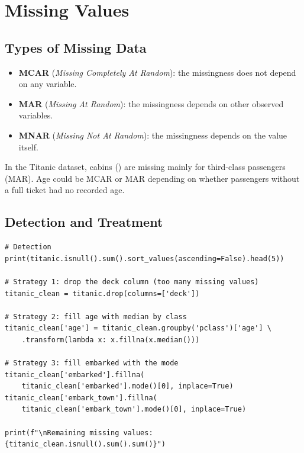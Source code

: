 \section{Missing Values}

\subsection{Types of Missing Data}

\begin{definition}
\begin{itemize}
    \item \textbf{MCAR} (\emph{Missing Completely At Random}): the missingness does not depend on any variable.
    \item \textbf{MAR} (\emph{Missing At Random}): the missingness depends on other observed variables.
    \item \textbf{MNAR} (\emph{Missing Not At Random}): the missingness depends on the value itself.
\end{itemize}
\end{definition}

\begin{example}
In the Titanic dataset, cabins () are missing mainly for third-class passengers (MAR). Age could be MCAR or MAR depending on whether passengers without a full ticket had no recorded age.
\end{example}

\subsection{Detection and Treatment}

\begin{codeblock}[title=\textbf{Python}]
\begin{verbatim}
# Detection
print(titanic.isnull().sum().sort_values(ascending=False).head(5))

# Strategy 1: drop the deck column (too many missing values)
titanic_clean = titanic.drop(columns=['deck'])

# Strategy 2: fill age with median by class
titanic_clean['age'] = titanic_clean.groupby('pclass')['age'] \
    .transform(lambda x: x.fillna(x.median()))

# Strategy 3: fill embarked with the mode
titanic_clean['embarked'].fillna(
    titanic_clean['embarked'].mode()[0], inplace=True)
titanic_clean['embark_town'].fillna(
    titanic_clean['embark_town'].mode()[0], inplace=True)

print(f"\nRemaining missing values: {titanic_clean.isnull().sum().sum()}")
\end{verbatim}
\end{codeblock}

